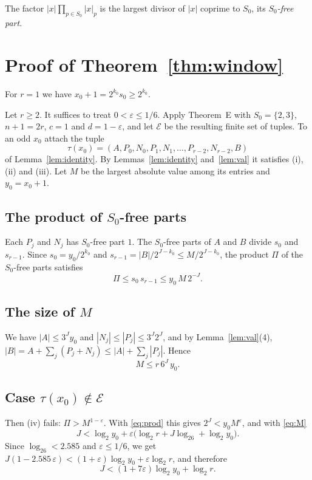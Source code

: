 \documentclass[11pt]{amsart}
\theoremstyle{remark}
\begin{document}
The factor $|x|\prod_{p\in S_0}|x|_p$ is the largest divisor of $|x|$ coprime to $S_0$, its
\emph{$S_0$-free part}.

\section{Proof of Theorem~\ref{thm:window}}

For $r=1$ we have $x_0+1=2^{k_0}s_0\ge 2^{k_0}$.

Let $r\ge 2$. It suffices to treat $0<\varepsilon\le 1/6$. Apply Theorem~E with
$S_0=\{2,3\}$, $n+1=2r$, $c=1$ and $d=1-\varepsilon$, and let $\mathcal{E}$ be the resulting
finite set of tuples. To an odd $x_0$ attach the tuple
\[
\tau(x_0)=(A,P_0,N_0,P_1,N_1,\dots,P_{r-2},N_{r-2},B)
\]
of Lemma~\ref{lem:identity}. By Lemmas~\ref{lem:identity} and~\ref{lem:val} it satisfies
(i), (ii) and (iii). Let $M$ be the largest absolute value among its entries and
$y_0=x_0+1$.

\subsection*{The product of $S_0$-free parts}
Each $P_j$ and $N_j$ has $S_0$-free part $1$. The $S_0$-free parts of $A$ and $B$ divide
$s_0$ and $s_{r-1}$. Since $s_0=y_0/2^{k_0}$ and $s_{r-1}=|B|/2^{J-k_0}\le M/2^{J-k_0}$, the
product $\Pi$ of the $S_0$-free parts satisfies
\begin{equation}\label{eq:prod}
\Pi\le s_0\,s_{r-1}\le y_0\,M\,2^{-J}.
\end{equation}

\subsection*{The size of $M$}
We have $|A|\le 3^Jy_0$ and $|N_j|\le|P_j|\le 3^J2^J$, and by Lemma~\ref{lem:val}(4),
$|B|=A+\sum_j(P_j+N_j)\le|A|+\sum_j|P_j|$. Hence
\begin{equation}\label{eq:M}
M\le r\,6^J\,y_0 .
\end{equation}

\subsection*{Case $\tau(x_0)\notin\mathcal{E}$}
Then (iv) fails: $\Pi>M^{1-\varepsilon}$. With \eqref{eq:prod} this gives
$2^J<y_0M^{\varepsilon}$, and with \eqref{eq:M}
\[
J<\log_2y_0+\varepsilon\bigl(\log_2r+J\log_26+\log_2y_0\bigr).
\]
Since $\log_26<2.585$ and $\varepsilon\le 1/6$, we get
$J(1-2.585\,\varepsilon)<(1+\varepsilon)\log_2y_0+\varepsilon\log_2r$, and therefore
\[
J<(1+7\varepsilon)\log_2y_0+\log_2r .
\]
\end{document}
